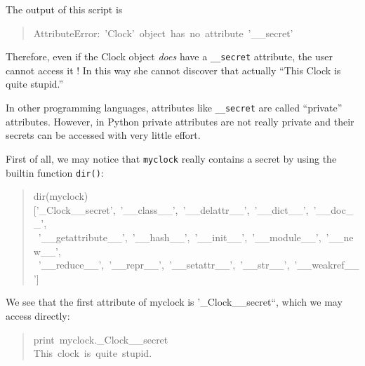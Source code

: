 \documentclass[10pt,english]{article}
\begin{document}
The output of this script is
\begin{quote}
\begin{ttfamily}\begin{flushleft}
\mbox{AttributeError:~'Clock'~object~has~no~attribute~'{\_}{\_}secret'}
\end{flushleft}\end{ttfamily}
\end{quote}

Therefore, even if the Clock object \emph{does} have a \texttt{{\_}{\_}secret} attribute, 
the user cannot access it ! In this way she cannot discover that
actually ``This Clock is quite stupid.''

In other programming languages, attributes like \texttt{{\_}{\_}secret} are
called ``private'' attributes. However, in Python private attributes
are not really private and their secrets can be accessed with very
little effort.

First of all, we may notice that \texttt{myclock} really contains a secret
by using the builtin function \texttt{dir()}:
\begin{quote}
\begin{ttfamily}\begin{flushleft}
\mbox{dir(myclock)}\\
\mbox{['{\_}Clock{\_}{\_}secret',~'{\_}{\_}class{\_}{\_}',~'{\_}{\_}delattr{\_}{\_}',~'{\_}{\_}dict{\_}{\_}',~'{\_}{\_}doc{\_}{\_}',~}\\
\mbox{~'{\_}{\_}getattribute{\_}{\_}',~'{\_}{\_}hash{\_}{\_}',~'{\_}{\_}init{\_}{\_}',~'{\_}{\_}module{\_}{\_}',~'{\_}{\_}new{\_}{\_}',~}\\
\mbox{~'{\_}{\_}reduce{\_}{\_}',~'{\_}{\_}repr{\_}{\_}',~'{\_}{\_}setattr{\_}{\_}',~'{\_}{\_}str{\_}{\_}',~'{\_}{\_}weakref{\_}{\_}']}
\end{flushleft}\end{ttfamily}
\end{quote}

We see that the first attribute of myclock is '{\_}Clock{\_}{\_}secret``, 
which we may access directly:
\begin{quote}
\begin{ttfamily}\begin{flushleft}
\mbox{print~myclock.{\_}Clock{\_}{\_}secret}\\
\mbox{This~clock~is~quite~stupid.}
\end{flushleft}\end{ttfamily}
\end{quote}
\end{document}
